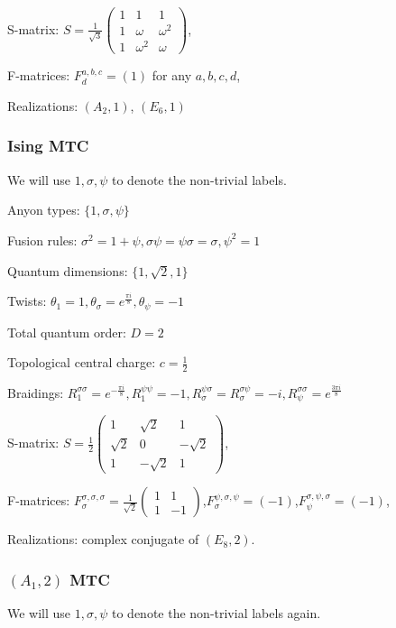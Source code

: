 \documentclass[12pt,psamsfonts]{amsart}
\numberwithin{equation}{section}
\theoremstyle{definition}
\begin{document}
S-matrix: $S=\frac{1}{\sqrt{3}}\begin{pmatrix} 1 &1 &1\\ 1 &
\omega&\omega^2\\1&\omega^2&\omega\end{pmatrix}$,

F-matrices:  $ F^{a,b,c}_d=(1)$ for any $a,b,c,d$,

Realizations: $(A_2,1)$, $(E_6,1)$

\subsubsection{Ising MTC}

We will use $1,\sigma,\psi$ to denote the non-trivial labels.

Anyon types: $\{1,\sigma, \psi\}$

Fusion rules:
$\sigma^2=1+\psi,\sigma\psi=\psi\sigma=\sigma,\psi^2=1$

Quantum dimensions: $\{1,\sqrt{2}, 1\}$

Twists: $\theta_1=1, \theta_{\sigma}=e^{\frac{\pi i}{8}},\theta_{\psi}=-1$

Total quantum order: $D=2$

Topological central charge: $c=\frac{1}{2}$

Braidings: $R_1^{\sigma \sigma}=e^{-\frac{\pi i}{8}},
R_1^{\psi\psi}=-1,
R_{\sigma}^{\psi\sigma}=R_{\sigma}^{\sigma\psi}=-i,
R_{\psi}^{\sigma\sigma}=e^{\frac{3\pi i}{8}}$

S-matrix: $ S=\frac{1}{2}\begin{pmatrix} 1 &\sqrt{2} &1\\\sqrt{2}
& 0&-\sqrt{2}\\ 1&-\sqrt{2}&1\end{pmatrix}$,

F-matrices: $
F^{\sigma,\sigma,\sigma}_{\sigma}=\frac{1}{\sqrt{2}}\begin{pmatrix}
1 &1\\ 1&-1\end{pmatrix}$,$ F^{\psi,\sigma,\psi}_{\sigma}=(-1)$,$
F^{\sigma,\psi,\sigma}_{\psi}=(-1)$,

Realizations: complex conjugate of $(E_8,2)$.

\subsubsection{$(A_1,2)$ MTC}

We will use $1,\sigma,\psi$ to denote the non-trivial labels
again.
\end{document}
